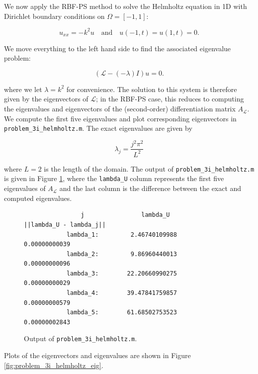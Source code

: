 \begin{solution}
    \pagebreak
    We now apply the RBF-PS method to solve the Helmholtz equation in 1D with Dirichlet boundary conditions on 
    $\Omega = [-1, 1]$:

    $$
    u_{xx} = -k^2 u \quad \text{and} \quad u(-1, t) = u(1, t) = 0. 
    $$

    We move everything to the left hand side to find the associated eigenvalue problem:

    $$
    \left( \mathcal{L} - (-\lambda) I \right) u = 0.
    $$

    where we let $\lambda = k^2$ for convenience. The solution to this system is therefore given by the eigenvectors of 
    $\mathcal{L}$; in the RBF-PS case, this reduces to computing the eigenvalues and eigenvectors of the (second-order) 
    differentiation matrix $A_{\mathcal{L}}$. We compute the first five eigenvalues and plot corresponding eigenvectors 
    in \texttt{problem\_3i\_helmholtz.m}. The exact eigenvalues are given by 
    
    $$
    \lambda_j = \frac{j^2 \pi^2}{L^2}
    $$
    
    where $L = 2$ is the length of the domain. The output of \texttt{problem\_3i\_helmholtz.m} is given in Figure 
    \ref{fig:problem_3i_helmholtz_output}, where the \texttt{lambda\_U} column represents the first five eigenvalues of 
    $A_{\mathcal{L}}$ and the last column is the difference between the exact and computed eigenvalues.

    \begin{figure}[h]
        \begin{verbatim}
                j                lambda_U         ||lambda_U - lambda_j||
            lambda_1:         2.46740109988           0.00000000039 
            lambda_2:         9.86960440013           0.00000000096 
            lambda_3:        22.20660990275           0.00000000029 
            lambda_4:        39.47841759857           0.00000000579 
            lambda_5:        61.68502753523           0.00000002843
        \end{verbatim}
        \caption{Output of \texttt{problem\_3i\_helmholtz.m}.}
        \label{fig:problem_3i_helmholtz_output}
    \end{figure}

    \pagebreak
    Plots of the eigenvectors and eigenvalues are shown in Figure \ref{fig:problem_3i_helmholtz_eig}.


\end{solution}

